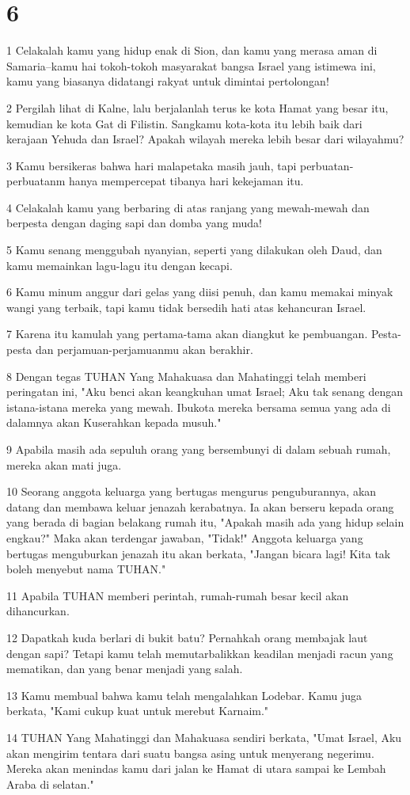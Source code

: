 \chapter{6}

\par 1 Celakalah kamu yang hidup enak di Sion, dan kamu yang merasa aman di Samaria--kamu hai tokoh-tokoh masyarakat bangsa Israel yang istimewa ini, kamu yang biasanya didatangi rakyat untuk dimintai pertolongan!
\par 2 Pergilah lihat di Kalne, lalu berjalanlah terus ke kota Hamat yang besar itu, kemudian ke kota Gat di Filistin. Sangkamu kota-kota itu lebih baik dari kerajaan Yehuda dan Israel? Apakah wilayah mereka lebih besar dari wilayahmu?
\par 3 Kamu bersikeras bahwa hari malapetaka masih jauh, tapi perbuatan-perbuatanm hanya mempercepat tibanya hari kekejaman itu.
\par 4 Celakalah kamu yang berbaring di atas ranjang yang mewah-mewah dan berpesta dengan daging sapi dan domba yang muda!
\par 5 Kamu senang menggubah nyanyian, seperti yang dilakukan oleh Daud, dan kamu memainkan lagu-lagu itu dengan kecapi.
\par 6 Kamu minum anggur dari gelas yang diisi penuh, dan kamu memakai minyak wangi yang terbaik, tapi kamu tidak bersedih hati atas kehancuran Israel.
\par 7 Karena itu kamulah yang pertama-tama akan diangkut ke pembuangan. Pesta-pesta dan perjamuan-perjamuanmu akan berakhir.
\par 8 Dengan tegas TUHAN Yang Mahakuasa dan Mahatinggi telah memberi peringatan ini, "Aku benci akan keangkuhan umat Israel; Aku tak senang dengan istana-istana mereka yang mewah. Ibukota mereka bersama semua yang ada di dalamnya akan Kuserahkan kepada musuh."
\par 9 Apabila masih ada sepuluh orang yang bersembunyi di dalam sebuah rumah, mereka akan mati juga.
\par 10 Seorang anggota keluarga yang bertugas mengurus penguburannya, akan datang dan membawa keluar jenazah kerabatnya. Ia akan berseru kepada orang yang berada di bagian belakang rumah itu, "Apakah masih ada yang hidup selain engkau?" Maka akan terdengar jawaban, "Tidak!" Anggota keluarga yang bertugas menguburkan jenazah itu akan berkata, "Jangan bicara lagi! Kita tak boleh menyebut nama TUHAN."
\par 11 Apabila TUHAN memberi perintah, rumah-rumah besar kecil akan dihancurkan.
\par 12 Dapatkah kuda berlari di bukit batu? Pernahkah orang membajak laut dengan sapi? Tetapi kamu telah memutarbalikkan keadilan menjadi racun yang mematikan, dan yang benar menjadi yang salah.
\par 13 Kamu membual bahwa kamu telah mengalahkan Lodebar. Kamu juga berkata, "Kami cukup kuat untuk merebut Karnaim."
\par 14 TUHAN Yang Mahatinggi dan Mahakuasa sendiri berkata, "Umat Israel, Aku akan mengirim tentara dari suatu bangsa asing untuk menyerang negerimu. Mereka akan menindas kamu dari jalan ke Hamat di utara sampai ke Lembah Araba di selatan."

